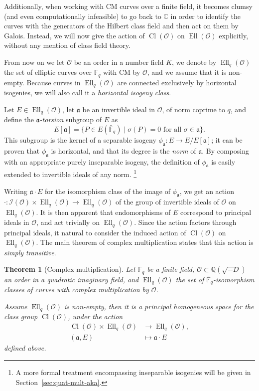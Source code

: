 \documentclass[10pt]{article}
\theoremstyle{plain}
\newtheorem{theorem}{Theorem}
\theoremstyle{definition}
\DeclareMathOperator{\Cl}{Cl}
\DeclareMathOperator{\Ell}{Ell}
\def\F{\ensuremath{\mathbb{F}}}
\def\O{\ensuremath{\mathcal{O}}}
\def\a{\ensuremath{\mathfrak{a}}}
\begin{document}
Additionally, when working with CM curves over a finite field, it
becomes clumsy (and even computationally infeasible) to go back to $ℂ$
in order to identify the curves with the generators of the Hilbert
class field and then act on them by Galois. %
Instead, we will now give the action of $\Cl(\O)$ on $\Ell(\O)$
explicitly, without any mention of class field theory. %

From now on we let $\O$ be an order in a number field $K$, we denote
by $\Ell_q(\O)$ the set of elliptic curves over $\F_q$ with CM by
$\O$, and we assume that it is non-empty. %
Because curves in $\Ell_q(\O)$ are connected exclusively by horizontal
isogenies, we will also call it a \emph{horizontal isogeny class}.

Let $E∈\Ell_q(\O)$, let $\a$ be an invertible ideal in $\O$, of norm
coprime to $q$, and define the \emph{${\a}$-torsion} subgroup of $E$
as
\begin{equation*}
  \label{eq:a-torsion}
  E[\a] = \{P ∈ E(\bar{\F}_q) \mid σ(P) = 0
  \text{ for all } σ ∈ \a \}.
\end{equation*}
This subgroup is the kernel of a separable isogeny
$\phi_{\a}:E→E/E[\a]$; it can be proven that $\phi_{\a}$ is
horizontal, and that its degree is the \emph{norm} of $\a$. %
By composing with an appropriate purely inseparable isogeny, the
definition of $ϕ_\a$ is easily extended to invertible ideals of any
norm.%
\footnote{A more formal treatment encompassing inseparable isogenies will be given in Section~\ref{sec:quat-mult-aka}.}

Writing $\a·E$ for the isomorphism class of the image of $ϕ_\a$, we
get an action $·:\mathcal{I}(\O)×\Ell_q(\O)→\Ell_q(\O)$ of the group
of invertible ideals of $\O$ on $\Ell_q(\O)$. %
It is then apparent that endomorphisms of $E$ correspond to principal
ideals in $\O$, and act trivially on $\Ell_q(\O)$. %
Since the action factors through principal ideals, it natural to
consider the induced action of $\Cl(\O)$ on $\Ell_q(\O)$. %
The main theorem of complex multiplication states that this action is
\emph{simply transitive}. %

\begin{theorem}[Complex multiplication]
  \label{th:compl-mul}
  Let $\F_q$ be a finite field, $\O⊂ℚ(\sqrt{-D})$ an order in a
  quadratic imaginary field, and $\Ell_q(\O)$ the set of
  $\bar{\F}_q$-isomorphism classes of curves with complex
  multiplication by $\O$. %

  Assume $\Ell_q(\O)$ is non-empty, then it is a \emph{principal
    homogeneous space} for the class group $\Cl(\O)$, under the action
  \begin{align*}
    \Cl(\O) × \Ell_q(\O) &→ \Ell_q(\O),\\
    (\a,E)  &↦ \a·E
  \end{align*}
  defined above.
\end{theorem}
\end{document}
